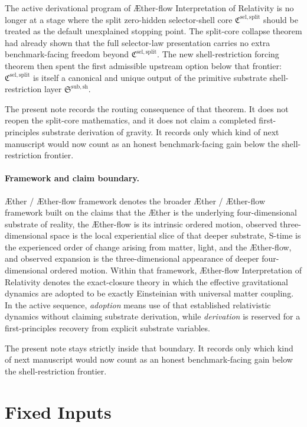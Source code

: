 \documentclass[11pt]{article}
\newcommand{\Aether}{\AE{}ther}
\newcommand{\Aflow}{\AE{}ther-flow}
\newcommand{\TheoryName}{\Aflow{} Interpretation of Relativity}
\newcommand{\TheoryProgram}{\Aether{} / \Aflow{} framework}
\newcommand{\SelectorCore}{\mathfrak C^{\mathrm{sel,split}}}
\newcommand{\ShellRestriction}{\mathfrak S^{\mathrm{sub,sh}}}
\begin{document}
The active derivational program of \TheoryName{} is no longer at a stage where the split zero-hidden selector-shell core \(\SelectorCore\) should be treated as the default unexplained stopping point. The split-core collapse theorem had already shown that the full selector-law presentation carries no extra benchmark-facing freedom beyond \(\SelectorCore\). The new shell-restriction forcing theorem then spent the first admissible upstream option below that frontier: \(\SelectorCore\) is itself a canonical and unique output of the primitive substrate shell-restriction layer \(\ShellRestriction\).

The present note records the routing consequence of that theorem. It does not reopen the split-core mathematics, and it does not claim a completed first-principles substrate derivation of gravity. It records only which kind of next manuscript would now count as an honest benchmark-facing gain below the shell-restriction frontier.

\paragraph{Framework and claim boundary.}
\TheoryProgram{} denotes the broader \Aether{} / \Aflow{} framework built on the claims that the \Aether{} is the underlying four-dimensional substrate of reality, the \Aflow{} is its intrinsic ordered motion, observed three-dimensional space is the local experiential slice of that deeper substrate, S-time is the experienced order of change arising from matter, light, and the \Aflow{}, and observed expansion is the three-dimensional appearance of deeper four-dimensional ordered motion. Within that framework, \TheoryName{} denotes the exact-closure theory in which the effective gravitational dynamics are adopted to be exactly Einsteinian with universal matter coupling. In the active sequence, \emph{adoption} means use of that established relativistic dynamics without claiming substrate derivation, while \emph{derivation} is reserved for a first-principles recovery from explicit substrate variables.

The present note stays strictly inside that boundary. It records only which kind of next manuscript would now count as an honest benchmark-facing gain below the shell-restriction frontier.

\section{Fixed Inputs}
\end{document}
